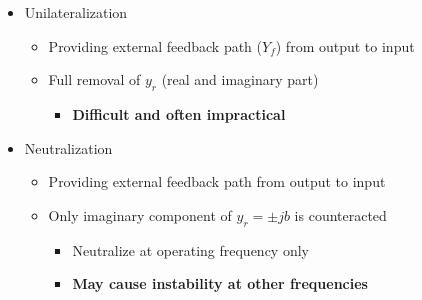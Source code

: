 \begin{itemize}
	\item Unilateralization
	\begin{itemize}
		\item Providing external feedback path ($Y_f$) from output to input
		\item Full removal of $y_r$ (real and imaginary part) 
		\begin{itemize}
			\item \textbf{Difficult and often impractical}
		\end{itemize}
	\end{itemize}
	\item Neutralization
	\begin{itemize}
		\item Providing external feedback path from	output to input
		\item Only imaginary component of $y_r = \pm jb$ is counteracted
		\begin{itemize}
			\item Neutralize at operating frequency only 
			\item \textbf{May cause instability	at other frequencies}
		\end{itemize}
	\end{itemize}
\end{itemize}

